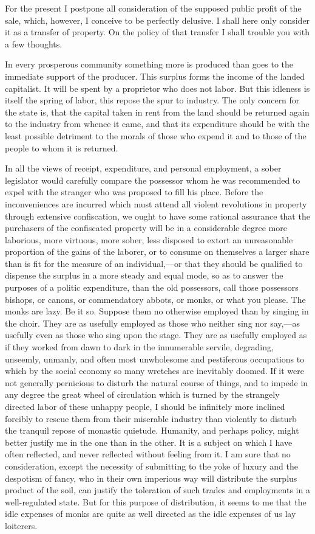 For the present I postpone all consideration of the supposed public profit of the sale, which, however, I conceive to be perfectly delusive. I shall here only consider it as a transfer of property. On the policy of that transfer I shall trouble you with a few thoughts.

In every prosperous community something more is produced than goes to the immediate support of the producer. This surplus forms the income of the landed capitalist. It will be spent by a proprietor who does not labor. But this idleness is itself the spring of labor, this repose the spur to industry. The only concern for the state is, that the capital taken in rent from the land should be returned again to the industry from whence it came, and that its expenditure should be with the least possible detriment to the morals of those who expend it and to those of the people to whom it is returned.

In all the views of receipt, expenditure, and personal employment, a sober legislator would carefully compare the possessor whom he was recommended to expel with the stranger who was proposed to fill his place. Before the inconveniences are incurred which must attend all violent revolutions in property through extensive confiscation, we ought to have some rational assurance that the purchasers of the confiscated property will be in a considerable degree more laborious, more virtuous, more sober, less disposed to extort an unreasonable proportion of the gains of the laborer, or to consume on themselves a larger share than is fit for the measure of an individual,—or that they should be qualified to dispense the surplus in a more steady and equal mode, so as to answer the purposes of a politic expenditure, than the old possessors, call those possessors bishops, or canons, or commendatory abbots, or monks, or what you please. The monks are lazy. Be it so. Suppose them no otherwise employed than by singing in the choir. They are as usefully employed as those who neither sing nor say,—as usefully even as those who sing upon the stage. They are as usefully employed as if they worked from dawn to dark in the innumerable servile, degrading, unseemly, unmanly, and often most unwholesome and pestiferous occupations to which by the social economy so many wretches are inevitably doomed. If it were not generally pernicious to disturb the natural course of things, and to impede in any degree the great wheel of circulation which is turned by the strangely directed labor of these unhappy people, I should be infinitely more inclined forcibly to rescue them from their miserable industry than violently to disturb the tranquil repose of monastic quietude. Humanity, and perhaps policy, might better justify me in the one than in the other. It is a subject on which I have often reflected, and never reflected without feeling from it. I am sure that no consideration, except the necessity of submitting to the yoke of luxury and the despotism of fancy, who in their own imperious way will distribute the surplus product of the soil, can justify the toleration of such trades and employments in a well-regulated state. But for this purpose of distribution, it seems to me that the idle expenses of monks are quite as well directed as the idle expenses of us lay loiterers.

